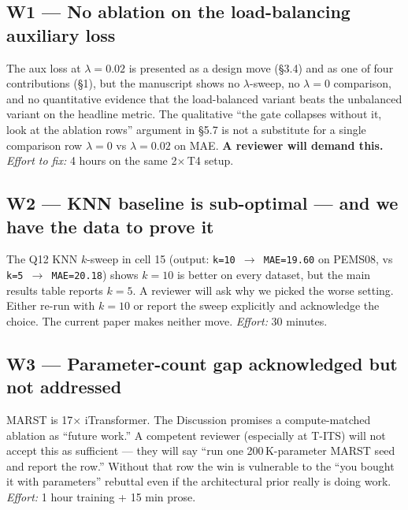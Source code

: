 \documentclass[11pt]{article}
\begin{document}
\subsection*{W1 --- No ablation on the load-balancing auxiliary loss}
The aux loss at $\lambda = 0.02$ is presented as a design move (\S3.4)
and as one of four contributions (\S1), but the manuscript shows no
$\lambda$-sweep, no $\lambda = 0$ comparison, and no quantitative
evidence that the load-balanced variant beats the unbalanced variant
on the headline metric.  The qualitative ``the gate collapses without
it, look at the ablation rows'' argument in \S5.7 is not a substitute
for a single comparison row $\lambda = 0$ vs $\lambda = 0.02$ on MAE.
\textbf{A reviewer will demand this.}
\textit{Effort to fix:} 4 hours on the same 2$\times$\,T4 setup.

\subsection*{W2 --- KNN baseline is sub-optimal --- and we have the data to prove it}
The Q12 KNN $k$-sweep in cell 15 (output:
\texttt{k=10 $\rightarrow$ MAE=19.60} on PEMS08, vs
\texttt{k=5 $\rightarrow$ MAE=20.18}) shows $k = 10$ is better on every
dataset, but the main results table reports $k = 5$.  A reviewer will
ask why we picked the worse setting.  Either re-run with $k = 10$ or
report the sweep explicitly and acknowledge the choice.  The current
paper makes neither move.
\textit{Effort:} 30 minutes.

\subsection*{W3 --- Parameter-count gap acknowledged but not addressed}
MARST is 17$\times$ iTransformer.  The Discussion promises a
compute-matched ablation as ``future work.''  A competent reviewer
(especially at T-ITS) will not accept this as sufficient --- they will
say ``run one 200\,K-parameter MARST seed and report the row.''
Without that row the win is vulnerable to the ``you bought it with
parameters'' rebuttal even if the architectural prior really is doing
work.
\textit{Effort:} 1 hour training + 15 min prose.
\end{document}
